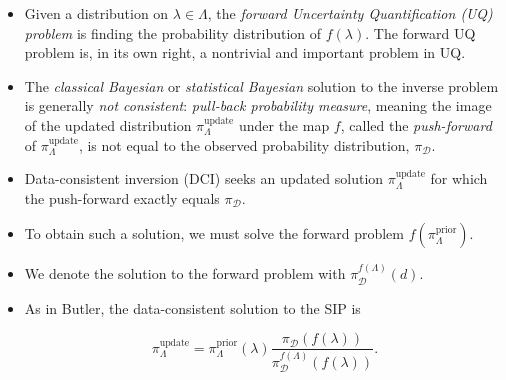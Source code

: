 \documentclass[11pt]{beamer}
\begin{document}
\begin{frame}
\begin{itemize}

\item Given a distribution on $\lambda \in \Lambda$, the \emph{forward Uncertainty Quantification (UQ) problem} is finding the probability distribution of $f(\lambda)$. The forward UQ problem is, in its own right, a nontrivial and important problem in UQ.

\item The \textit{classical Bayesian} or \textit{statistical Bayesian} solution to the inverse problem is generally {\em not consistent}:  
\textit{pull-back probability measure}, meaning the image of the updated distribution $\pi_\Lambda^\text{update}$ under the map $f$, called the \textit{push-forward} of $\pi_\Lambda^\text{update}$, is not equal to the observed probability distribution, $\pi_\mathcal{D}$. 


\end{itemize}

\end{frame}

\begin{frame}

\begin{itemize}

	\item Data-consistent inversion (DCI) seeks an updated solution $\pi_\Lambda^\text{update}$ for which the push-forward exactly equals $\pi_\mathcal{D}$. 
	
	\item To obtain such a solution, we must solve the forward problem $f(\pi_\Lambda^\text{prior})$.
	
	\item We denote the solution to the forward problem with $\pi_\mathcal{D}^{f(\Lambda)}(d)$.

\end{itemize}

\end{frame}

\begin{frame}

\begin{itemize}


	\item As in Butler, the data-consistent solution to the SIP is 
	
\begin{equation} \label{eq:1}
\pi_\Lambda^\text{update}=\pi_\Lambda^\text{prior}(\lambda)\frac{\pi_\mathcal{D}(f(\lambda))}{\pi_\mathcal{D}^{f(\Lambda)}(f(\lambda))}.
\end{equation}

	
\end{itemize}


\end{frame}
\end{document}
